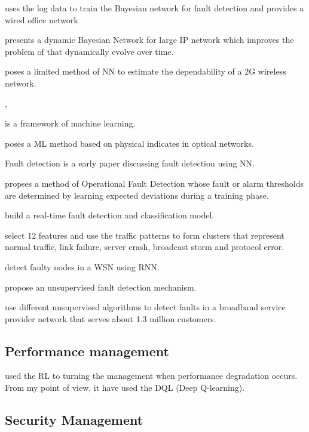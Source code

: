 \documentclass[journal,UTF8]{IEEEtran}
\begin{document}
\cite{Hood1997Proactive} uses the log data to train the Bayesian network for fault detection and provides  a wired office network

\cite{Ding2004Predictive} presents a dynamic Bayesian Network for large IP network which improves the problem of \cite{Hood1997Proactive} that dynamically evolve over time.

\cite{Snow2005Assessing} poses a limited method of NN to estimate the dependability of a 2G wireless network.


\cite{Kogeda2006A}, \cite{Lu2010Using} 

\cite{pellegrini2015machine} is a framework of machine learning.

\cite{Song2017Failure} poses a ML method based on physical indicates in optical networks.

\cite{Kumar2017Fault}



Fault detection
\cite{baras1997automated} is a early paper discussing fault detection using NN.

\cite{Rao2006Operational} propses a method of Operational Fault Detection whose fault or alarm thresholds are determined by learning expected deviations during a training phase.

\cite{Qader2017Comparative} build a real-time fault detection and classification model.

\cite{Qader2014Fault} select 12 features  and use the traffic patterns to form clusters that represent normal traffic, link failure, server crash, broadcast storm and protocol error.


\cite{Moustapha2008Wireless} detect faulty nodes in a WSN using RNN.

\cite{Hajji2005Statistical}  propose an unsupervised fault detection mechanism.

\cite{Hashmi2017Enabling} use different unsupervised algorithms to detect faults in a broadband service provider network that serves about 1.3 million customers.


\cite{Rafique2018Cognitive}

\subsection{Performance management}
\cite{Kumar2002Network} used the RL to turning the management when performance degradation occurs. From my point of view, it have used the DQL (Deep Q-learning).

\subsection{Security Management}
\end{document}

